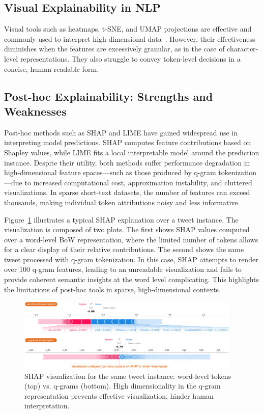 \documentclass[runningheads,10pt]{llncs}
\begin{document}
\subsection{Visual Explainability in \ac{NLP}}

Visual tools such as heatmaps, t-SNE, and UMAP projections are effective and commonly used to interpret high-dimensional data~\cite{peeters2021exploring,do2021generalization}. However, their effectiveness diminishes when the features are excessively granular, as in the case of character-level representations. They also struggle to convey token-level decisions in a concise, human-readable form.

\subsection{Post-hoc Explainability: Strengths and Weaknesses}
\label{post-hoc-strengths}

Post-hoc methods such as \ac{SHAP} and \ac{LIME} have gained widespread use in interpreting model predictions. \ac{SHAP} computes feature contributions based on Shapley values, while \ac{LIME} fits a local interpretable model around the prediction instance. Despite their utility, both methods suffer performance degradation in high-dimensional feature spaces—such as those produced by q-gram tokenization—due to increased computational cost, approximation instability, and cluttered visualizations. In sparse short-text datasets, the number of features can exceed thousands, making individual token attributions noisy and less informative.

Figure~\ref{fig:shap_visual} illustrates a typical \ac{SHAP} explanation over a tweet instance. The visualization is composed of two plots. The first shows \ac{SHAP} values computed over a word-level \ac{BoW} representation, where the limited number of tokens allows for a clear display of their relative contributions. The second shows the same tweet processed with q-gram tokenization. In this case, \ac{SHAP} attempts to render over 100 q-gram features, leading to an unreadable visualization and fails to provide coherent semantic insights at the word level complicating. This highlights the limitations of post-hoc tools in sparse, high-dimensional contexts.

\begin{figure}[ht]
    \centering
    \includegraphics[width=0.95\textwidth]{shap-instance.drawio.png}
    \caption{\ac{SHAP} visualization for the same tweet instance: word-level tokens (top) vs. q-grams (bottom). High dimensionality in the q-gram representation prevents effective visualization, hinder human interpretation.}
    \label{fig:shap_visual}
\end{figure}
\end{document}
